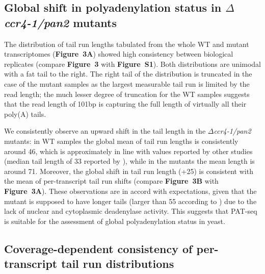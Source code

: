 \documentclass[10pt]{article}
\begin{document}
\subsection*{Global shift in polyadenylation status in \textit{$\Delta$ccr4-1/pan2} mutants}

The distribution of tail run lengths tabulated from the whole WT and mutant transcriptomes (\textbf{Figure~3A}) showed high consistency between biological replicates (compare \textbf{Figure~3} with \textbf{Figure~S1}). Both distributions are unimodal with a fat tail to the right. The right tail of the distribution is truncated in the case of the mutant samples as the largest measurable tail run is limited by the read length; the much lesser degree of truncation for the WT samples suggests that the read length of 101bp is capturing the full length of virtually all their poly(A) tails.

We consistently observe an upward shift in the tail length in the \textit{$\Delta$ccr4-1/pan2} mutants: in WT samples the global mean of tail run lengths is consistently around 46, which is approximately in line with values reported by other studies (median tail length of 33 reported by \cite{subtelny14}), while in the mutants the mean length is around 71. Moreover, the global shift in tail run length (+25) is consistent with the mean of per-transcript tail run shifts (compare \textbf{Figure~3B} with \textbf{Figure~3A}). These observations are in accord with expectations, given that the mutant is supposed to have longer tails (larger than 55 according to \cite{beilharz07}) due to the lack of nuclear and cytoplasmic deadenylase activity. This suggests that PAT-seq is suitable for the assessment of global polyadenylation status in yeast.

\subsection*{Coverage-dependent consistency of per-transcript tail run distributions}
\end{document}
